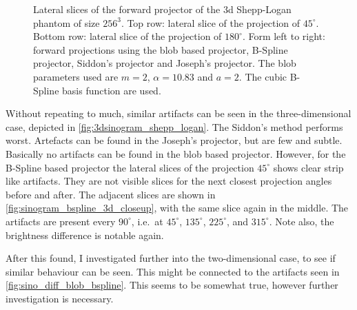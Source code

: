 \begin{figure}
	\caption{Lateral slices of the forward projector of the \(3\)d Shepp-Logan phantom of size
		\(256^3\). Top row: lateral slice of the projection of \(45^\circ\). Bottom row:
		lateral slice of the projection of \(180^\circ\). Form left to right: forward
		projections using the blob based projector, B-Spline projector, Siddon's projector
		and Joseph's projector. The blob parameters used are \(m=2\), \(\alpha=10.83\) and
		\(a=2\). The cubic B-Spline basis function are used.
	}\label{fig:3dsinogram_shepp_logan}
\end{figure}

Without repeating to much, similar artifacts can be seen in the three-dimensional case, depicted in
\autoref{fig:3dsinogram_shepp_logan}. The Siddon's method performs worst. Artefacts can be found in
the Joseph's projector, but are few and subtle. Basically no artifacts can be found in the blob
based projector. However, for the B-Spline based projector the lateral slices of the projection
\(45^\circ\) shows clear strip like artifacts. They are not visible slices for the next closest
projection angles before and after. The adjacent slices are shown in
\autoref{fig:sinogram_bspline_3d_closeup}, with the same slice again in the middle. The artifacts
are present every \(90^\circ\), i.e.\ at \(45^\circ\), \(135^\circ\), \(225^\circ\), and
\(315^\circ\). Note also, the brightness difference is notable again.

After this found, I investigated further into the two-dimensional case, to see if similar behaviour
can be seen. This might be connected to the artifacts seen in \autoref{fig:sino_diff_blob_bspline}.
This seems to be somewhat true, however further investigation is necessary.

